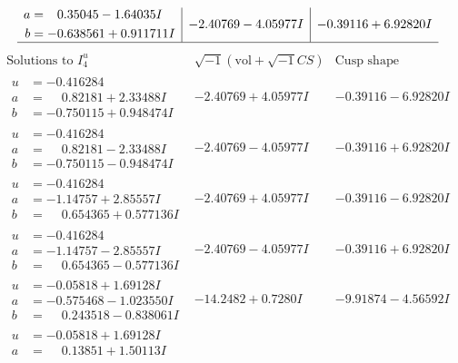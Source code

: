 \documentclass[1p]{elsarticle_modified}
\theoremstyle{definition}
\newcommand{\I}{\sqrt{-1}}
\begin{document}
$$\begin{array}{c|c|c}
\begin{aligned}
a &= \phantom{-}0.35045 - 1.64035 I \\
b &= -0.638561 + 0.911711 I\end{aligned}
 & -2.40769 - 4.05977 I & -0.39116 + 6.92820 I\\
 \hline 
 \end{array}$$\newpage$$\begin{array}{c|c|c}  
\text{Solutions to }I^u_{4}& \I (\text{vol} + \sqrt{-1}CS) & \text{Cusp shape}\\
 \hline 
\begin{aligned}
u &= -0.416284\phantom{ +0.000000I} \\
a &= \phantom{-}0.82181 + 2.33488 I \\
b &= -0.750115 + 0.948474 I\end{aligned}
 & -2.40769 + 4.05977 I & -0.39116 - 6.92820 I \\ \hline\begin{aligned}
u &= -0.416284\phantom{ +0.000000I} \\
a &= \phantom{-}0.82181 - 2.33488 I \\
b &= -0.750115 - 0.948474 I\end{aligned}
 & -2.40769 - 4.05977 I & -0.39116 + 6.92820 I \\ \hline\begin{aligned}
u &= -0.416284\phantom{ +0.000000I} \\
a &= -1.14757 + 2.85557 I \\
b &= \phantom{-}0.654365 + 0.577136 I\end{aligned}
 & -2.40769 + 4.05977 I & -0.39116 - 6.92820 I \\ \hline\begin{aligned}
u &= -0.416284\phantom{ +0.000000I} \\
a &= -1.14757 - 2.85557 I \\
b &= \phantom{-}0.654365 - 0.577136 I\end{aligned}
 & -2.40769 - 4.05977 I & -0.39116 + 6.92820 I \\ \hline\begin{aligned}
u &= -0.05818 + 1.69128 I \\
a &= -0.575468 - 1.023550 I \\
b &= \phantom{-}0.243518 - 0.838061 I\end{aligned}
 & -14.2482 + 0.7280 I & -9.91874 - 4.56592 I \\ \hline\begin{aligned}
u &= -0.05818 + 1.69128 I \\
a &= \phantom{-}0.13851 + 1.50113 I \\

\end{aligned}
\end{array}$$
\end{document}
